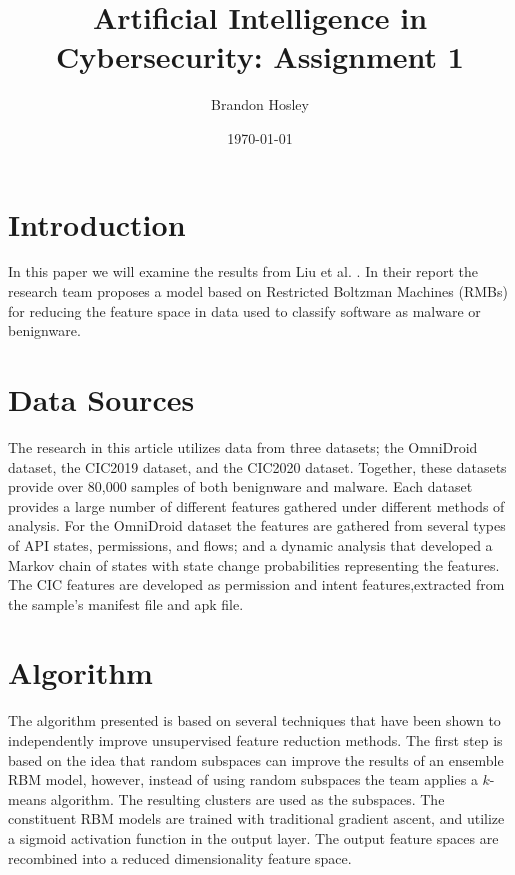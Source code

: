 \documentclass[]{article}
\title{Artificial Intelligence in Cybersecurity: Assignment 1}
\author{Brandon Hosley}
\date{\today}
\begin{document}
	\maketitle
	
\section{Introduction}

In this paper we will examine the results from Liu et al. \cite{Liu2021}. In their report the research team proposes a model based on Restricted Boltzman Machines (RMBs) for reducing the feature space in data used to classify software as malware or benignware.

\section{Data Sources}

The research in this article utilizes data from three datasets; 
the OmniDroid \cite{Martin2019} dataset,  
the CIC2019 \cite{Taheri2019} dataset, and
the CIC2020 \cite{Rahali2020} dataset.
Together, these datasets provide over 80,000 samples of both benignware and malware.
Each dataset provides a large number of different features gathered under different methods of analysis.
For the OmniDroid dataset the features are gathered from several types of API states, permissions, and flows;
and a dynamic analysis that developed a Markov chain of states with state change probabilities representing the features.
The CIC features are developed as permission and intent features,extracted from the sample's manifest file and apk file.

\section{Algorithm}

The algorithm presented is based on several techniques that have been shown to independently improve unsupervised feature reduction methods.
The first step is based on the idea that random subspaces can improve the results of an ensemble RBM model, however, instead of using random subspaces the team applies a $k$-means algorithm.
The resulting clusters are used as the subspaces.
The constituent RBM models are trained with traditional gradient ascent, and utilize a sigmoid activation function in the output layer.
The output feature spaces are recombined into a reduced dimensionality feature space.
\end{document}
